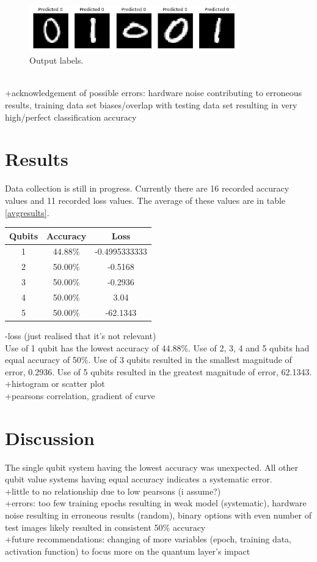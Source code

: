 \documentclass[12pt, a4paper]{article}
\begin{document}
\begin{figure}[h]
    \centering
    \includegraphics[width=0.8\textwidth]{T5Q5_Labels.png}
    \caption{Output labels.}
    \label{fig:T5Q5_Labels}
\end{figure}
\\+acknowledgement of possible errors: hardware noise contributing to erroneous results, training data set biases/overlap with testing data set resulting in very high/perfect classification accuracy
\newpage
\section{Results}
Data collection is still in progress. Currently there are 16 recorded accuracy values and 11 recorded loss values. The average of these values are in table \ref{avgresults}.
\begin{center}
\begin{tabular}[h]{ |c|c|c| }
\hline
Qubits & Accuracy & Loss\\
\hline
{1} & {44.88\%} & {-0.4995333333}\\ 
\hline
{2} & {50.00\%} & {-0.5168}\\
\hline
{3} & {50.00\%} & {-0.2936}\\ 
\hline
{4} & {50.00\%} & {3.04}\\ 
\hline
{5} & {50.00\%} & {-62.1343}\\ 
\hline
\end{tabular}
 \label{avgresults}
\end{center}
-loss (just realised that it's not relevant)\\
Use of 1 qubit has the lowest accuracy of 44.88\%. Use of 2, 3, 4 and 5 qubits had equal accuracy of 50\%. Use of 3 qubits resulted in the smallest magnitude of error, 0.2936. Use of 5 qubits resulted in the greatest magnitude of error, 62.1343.
\\+histogram or scatter plot
\\+pearsons correlation, gradient of curve

\section{Discussion}
The single qubit system having the lowest accuracy was unexpected. All other qubit value systems having equal accuracy indicates a systematic error.
\\+little to no relationship due to low pearsons (i assume?)
\\+errors: too few training epochs resulting in weak model (systematic), hardware noise resulting in erroneous results (random), binary options with even number of test images likely resulted in consistent 50\% accuracy
\\+future recommendations: changing of more variables (epoch, training data, activation function) to focus more on the quantum layer's impact
\end{document}
